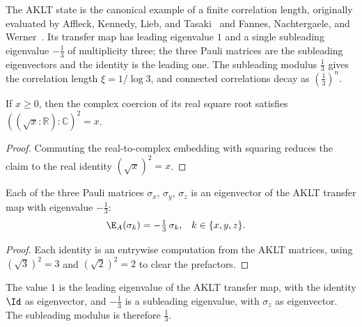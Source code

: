 The AKLT state is the canonical example of a finite correlation length,
originally evaluated by Affleck, Kennedy, Lieb, and
Tasaki~\cite{AKLT1987Rigorous,AKLT1988ValenceBond} and Fannes, Nachtergaele, and
Werner~\cite{Fannes1992Finitely}. Its transfer map has leading eigenvalue $1$
and a single subleading eigenvalue $-\tfrac13$ of multiplicity three; the three
Pauli matrices are the subleading eigenvectors and the identity is the leading
one. The subleading modulus $\tfrac13$ gives the correlation length
$\xi = 1/\log 3$, and connected correlations decay as $(\tfrac13)^n$.

\begin{lemma}
    \label{lem:complex_ofreal_sqrt_sq}
    \leanok
    If $x\geq 0$, then the complex coercion of its real square root satisfies
    $((\sqrt{x}:\mathbb R):\mathbb C)^2=x$.
\end{lemma}

\begin{proof}
    \leanok
    Commuting the real-to-complex embedding with squaring reduces the claim to
    the real identity $(\sqrt{x})^2=x$.
\end{proof}

\begin{lemma}\label{thm:aklt_pauli_eigenvectors}
    \leanok
    Each of the three Pauli matrices $\sigma_x$, $\sigma_y$, $\sigma_z$ is an
    eigenvector of the AKLT transfer map with eigenvalue $-\tfrac13$:
    \begin{align}
        \E_A(\sigma_k) & = -\tfrac13\,\sigma_k,
                       & k                      & \in \{x,y,z\}.
        \notag
    \end{align}
\end{lemma}

\begin{proof}
    \leanok
    Each identity is an entrywise computation from the AKLT matrices, using
    $(\sqrt{3})^2 = 3$ and $(\sqrt{2})^2 = 2$ to clear the prefactors.
\end{proof}

\begin{lemma}\label{thm:aklt_subleading_eigenvalue}
    \leanok
    The value $1$ is the leading eigenvalue of the AKLT transfer map, with the
    identity $\Id$ as eigenvector, and $-\tfrac13$ is a subleading eigenvalue,
    with $\sigma_z$ as eigenvector. The subleading modulus is therefore
    $\tfrac13$.
\end{lemma}

